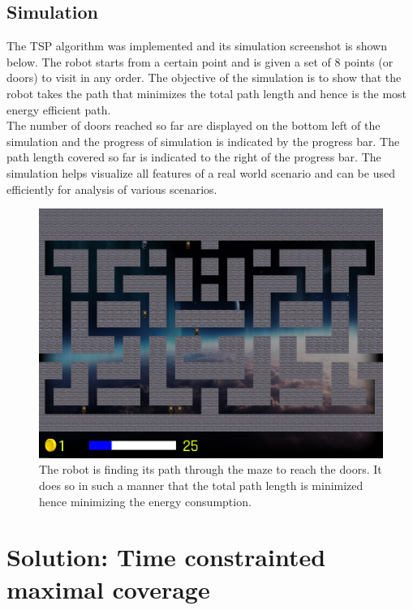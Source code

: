 \documentclass{article}
\begin{document}
\subsection{Simulation}
The TSP algorithm was implemented and its simulation screenshot is shown below. The robot starts from a certain point and is given 
a set of 8 points (or doors) to visit in any order. The objective of the simulation is to show that the robot takes the path that minimizes the
total path length and hence is the most energy efficient path.\\

The number of doors reached so far are displayed on the bottom left of the simulation and the progress of simulation is indicated by the progress bar.
The path length covered so far is indicated to the right of the progress bar. The simulation helps visualize all features of a real world scenario and
can be used efficiently for analysis of various scenarios.
\begin{figure}[h!]
    \centering
    \includegraphics[width=\textwidth]{../sim.png}
    \caption{The robot is finding its path through the maze to reach the doors. It does so in such a manner that the total path length is minimized hence minimizing the energy consumption.}
\end{figure}


\newpage
\section{Solution: Time constrainted maximal coverage}
\end{document}
